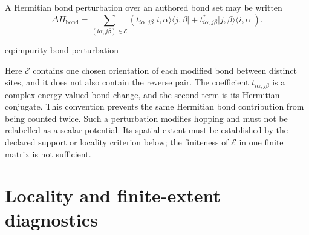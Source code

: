A Hermitian bond perturbation over an authored bond set may be written
\begin{equation}
    \Delta H_{\mathrm{bond}}
    =
    \sum_{(i\alpha,j\beta)\in\mathcal E}
    \left(
      t_{i\alpha,j\beta}
      \lvert i,\alpha\rangle\langle j,\beta\rvert
      +
      t_{i\alpha,j\beta}^{*}
      \lvert j,\beta\rangle\langle i,\alpha\rvert
    \right).
    \label{eq:impurity-bond-perturbation}
\end{equation}
\begin{equationterms}{eq:impurity-bond-perturbation}
\end{equationterms}
Here $\mathcal E$ contains one chosen orientation of each modified bond between
distinct sites, and it does not also contain the reverse pair.
The coefficient $t_{i\alpha,j\beta}$ is a complex energy-valued bond change,
and the second term is its Hermitian conjugate. This convention prevents the
same Hermitian bond contribution from being counted twice. Such a perturbation
modifies hopping and must not be relabelled as a scalar potential. Its spatial
extent must be established by the declared support or locality criterion below;
the finiteness of $\mathcal E$ in one finite matrix is not sufficient.

\section{Locality and finite-extent diagnostics}

